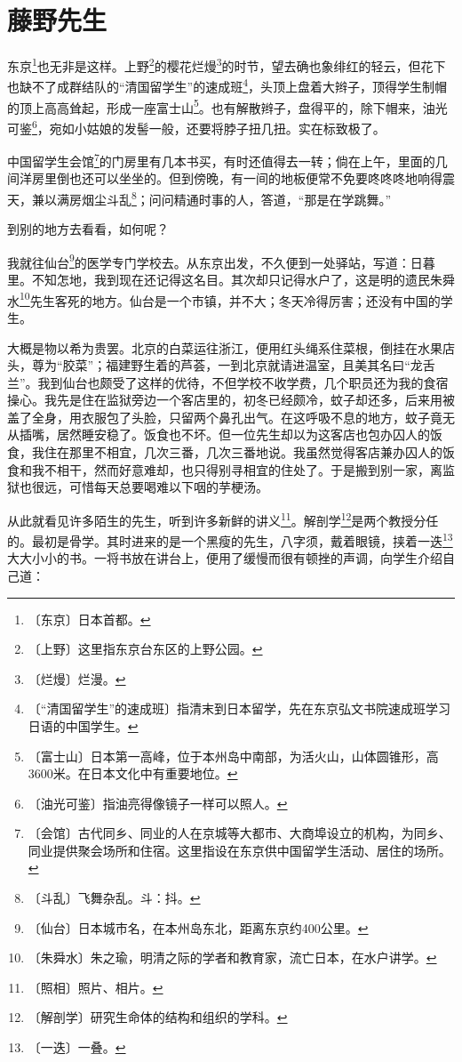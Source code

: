 \documentclass[12pt,UTF-8,openany]{ctexbook}
\begin{document}
\chapter{藤野先生}

\begin{large}
    
    东京\footnote{〔东京〕日本首都。}也无非是这样。上野\footnote{〔上野〕这里指东京台东区的上野公园。}的樱花烂熳\footnote{〔烂熳〕烂漫。}的时节，望去确也象绯红的轻云，但花下也缺不了成群结队的“清国留学生”的速成班\footnote{〔“清国留学生”的速成班〕指清末到日本留学，先在东京弘文书院速成班学习日语的中国学生。}，头顶上盘着大辫子，顶得学生制帽的顶上高高耸起，形成一座富士山\footnote{〔富士山〕日本第一高峰，位于本州岛中南部，为活火山，山体圆锥形，高3600米。在日本文化中有重要地位。}。也有解散辫子，盘得平的，除下帽来，油光可鉴\footnote{〔油光可鉴〕指油亮得像镜子一样可以照人。}，宛如小姑娘的发髻一般，还要将脖子扭几扭。实在标致极了。
    
    中国留学生会馆\footnote{〔会馆〕古代同乡、同业的人在京城等大都市、大商埠设立的机构，为同乡、同业提供聚会场所和住宿。这里指设在东京供中国留学生活动、居住的场所。}的门房里有几本书买，有时还值得去一转；倘在上午，里面的几间洋房里倒也还可以坐坐的。但到傍晚，有一间的地板便常不免要咚咚咚地响得震天，兼以满房烟尘斗乱\footnote{〔斗乱〕飞舞杂乱。斗：抖。}；问问精通时事的人，答道，“那是在学跳舞。”
    
    到别的地方去看看，如何呢？
    
    我就往仙台\footnote{〔仙台〕日本城市名，在本州岛东北，距离东京约400公里。}的医学专门学校去。从东京出发，不久便到一处驿站，写道：日暮里。不知怎地，我到现在还记得这名目。其次却只记得水户了，这是明的遗民朱舜水\footnote{〔朱舜水〕朱之瑜，明清之际的学者和教育家，流亡日本，在水户讲学。}先生客死的地方。仙台是一个市镇，并不大；冬天冷得厉害；还没有中国的学生。
    
    大概是物以希为贵罢。北京的白菜运往浙江，便用红头绳系住菜根，倒挂在水果店头，尊为“胶菜”；福建野生着的芦荟，一到北京就请进温室，且美其名曰“龙舌兰”。我到仙台也颇受了这样的优待，不但学校不收学费，几个职员还为我的食宿操心。我先是住在监狱旁边一个客店里的，初冬已经颇冷，蚊子却还多，后来用被盖了全身，用衣服包了头脸，只留两个鼻孔出气。在这呼吸不息的地方，蚊子竟无从插嘴，居然睡安稳了。饭食也不坏。但一位先生却以为这客店也包办囚人的饭食，我住在那里不相宜，几次三番，几次三番地说。我虽然觉得客店兼办囚人的饭食和我不相干，然而好意难却，也只得别寻相宜的住处了。于是搬到别一家，离监狱也很远，可惜每天总要喝难以下咽的芋梗汤。
    
    从此就看见许多陌生的先生，听到许多新鲜的讲义\footnote{〔照相〕照片、相片。}。解剖学\footnote{〔解剖学〕研究生命体的结构和组织的学科。}是两个教授分任的。最初是骨学。其时进来的是一个黑瘦的先生，八字须，戴着眼镜，挟着一迭\footnote{〔一迭〕一叠。}大大小小的书。一将书放在讲台上，便用了缓慢而很有顿挫的声调，向学生介绍自己道：
    

\end{large}
\end{document}
